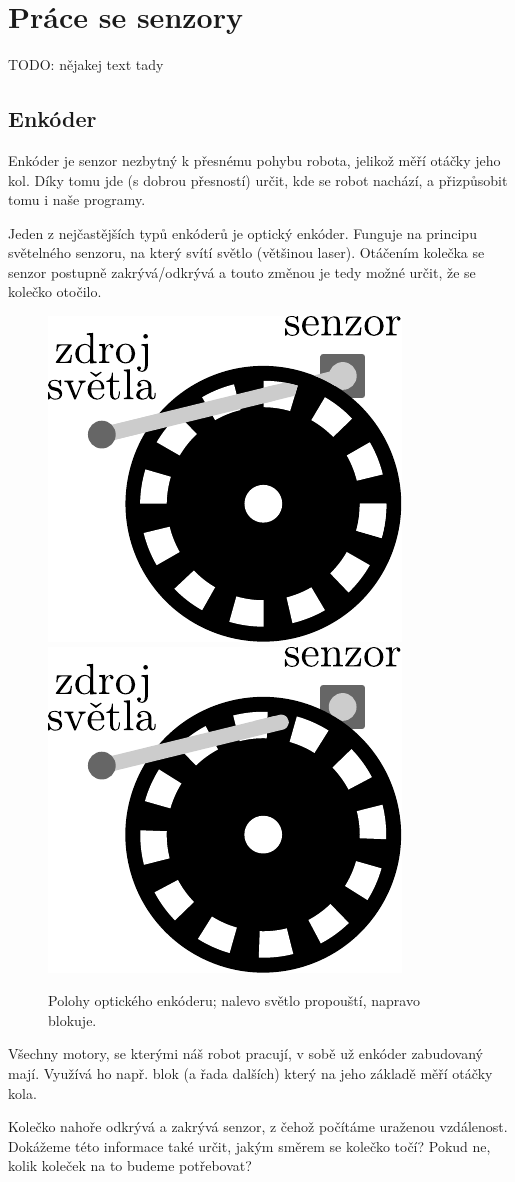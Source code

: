 \documentclass[../main.tex]{subfiles}
\begin{document}
	\section{Práce se senzory}
	TODO: nějakej text tady
	
	\subsection{Enkóder}\label{cha:encoder}
	Enkóder je senzor nezbytný k přesnému pohybu robota, jelikož měří otáčky jeho kol. Díky tomu jde (s dobrou přesností) určit, kde se robot nachází, a přizpůsobit tomu i naše programy.

	Jeden z nejčastějších typů enkóderů je optický enkóder. Funguje na principu světelného senzoru, na který svítí světlo (většinou laser). Otáčením kolečka se senzor postupně zakrývá/odkrývá a touto změnou je tedy možné určit, že se kolečko otočilo.

	\begin{figure}
		\centering%
		\includegraphics[width=0.25\linewidth]{Images/03/encoder-through.pdf}
		\hspace{.15\textwidth}%
		\includegraphics[width=0.25\linewidth]{Images/03/encoder-blocked.pdf}
		\caption{Polohy optického enkóderu; nalevo světlo propouští, napravo blokuje.}
	\end{figure}

	Všechny motory, se kterými náš robot pracují, v sobě už enkóder zabudovaný mají. Využívá ho např. blok \blockMotorDistanceImage (a řada dalších) který na jeho základě měří otáčky kola.

	\begin{question}
		Kolečko nahoře odkrývá a zakrývá senzor, z čehož počítáme uraženou vzdálenost. Dokážeme této informace také určit, jakým směrem se kolečko točí? Pokud ne, kolik koleček na to budeme potřebovat?
	\end{question}
\end{document}
